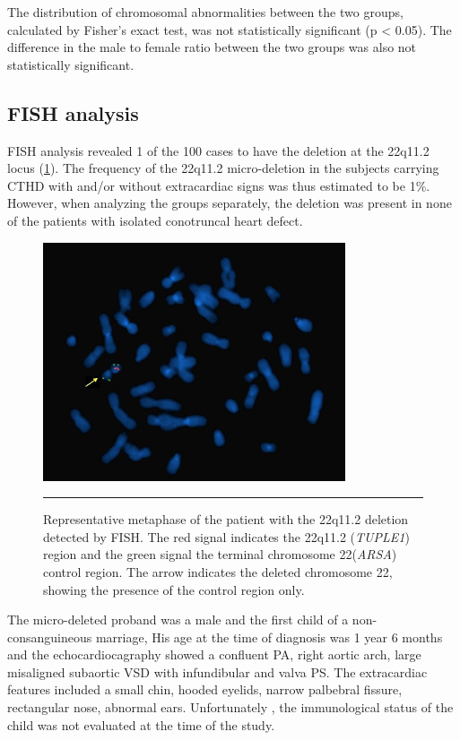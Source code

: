 \begin{refsection}
The distribution of chromosomal abnormalities between the two groups, calculated by Fisher’s exact test, was not statistically significant (p < 0.05). The difference in the male to female ratio between the two groups was also not statistically significant.

\subsection*{FISH analysis}
FISH analysis revealed 1 of the 100 cases to have the deletion at the 22q11.2 locus (\cref{fig:FISH3.4}). The frequency of the 22q11.2 micro-deletion in the subjects carrying CTHD with and/or without extracardiac signs was thus estimated to be 1\%. However, when analyzing the groups separately, the deletion was present in none of the patients with isolated conotruncal heart defect. 

\begin{figure}[!tb]
\centering
\includegraphics[width=\linewidth]{Figures/Figure3_4.pdf}
\rule{35em}{0.5pt}
\caption{Representative metaphase of the patient with the 22q11.2 deletion detected by FISH.
The red signal indicates the 22q11.2 (\textit{TUPLE1}) region and the green signal the terminal chromosome 22(\textit{ARSA}) control region.
The arrow indicates the deleted chromosome 22, showing the presence of the control region only.}
\label{fig:FISH3.4}
\end{figure}

The micro-deleted proband was a male and the first child of a non- consanguineous marriage, His age at the time of diagnosis was 1 year 6 months and the echocardiocagraphy showed a confluent PA, right aortic arch, large misaligned subaortic VSD with infundibular and valva PS. The extracardiac features included a small chin, hooded eyelids, narrow palbebral fissure, rectangular nose, abnormal ears. Unfortunately , the immunological status of the child was not evaluated at the time of the study.




\end{refsection}

